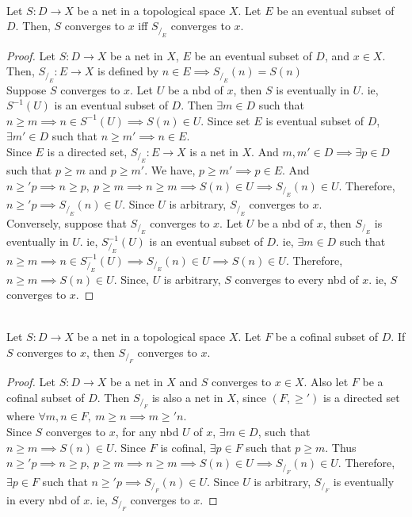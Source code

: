 \begin{proposition}\cite[10.1.6]{joshi}\\
	Let $S : D \to X$ be a net in a topological space $X$. Let $E$ be an eventual subset of $D$. Then, $S$ converges to $x$ iff $S_{/_E}$ converges to $x$.\cite[10.1.6]{joshi}
\end{proposition}
\begin{proof}
	Let $S : D \to X$ be a net in $X$, $E$ be an eventual subset of $D$, and $x \in X$. Then, $S_{/_E} : E \to X$ is defined by $n \in E \implies S_{/_E}(n) = S(n)$\\
	
	Suppose $S$ converges to $x$. Let $U$ be a nbd of $x$, then $S$ is eventually in $U$. ie, $S^{-1}(U)$ is an eventual subset of $D$. Then $\exists m \in D$ such that $n \ge m \implies n \in S^{-1}(U) \implies S(n) \in U$. Since set $E$ is eventual subset of $D$, $\exists m' \in D$ such that $n \ge m' \implies n \in E$.\\
	
	Since $E$ is a directed set, $S_{/_E} : E \to X$ is a net in $X$. And $m,m' \in D \implies \exists p \in D$ such that $p \ge m$ and $p \ge m'$. We have, $p \ge m' \implies p \in E$. And $n \ge' p \implies n \ge p,\ p \ge m \implies n \ge m \implies S(n) \in U \implies S_{/_E}(n) \in U$. Therefore, $n \ge' p \implies S_{/_E}(n) \in U$. Since $U$ is arbitrary, $S_{/_E}$ converges to $x$.\\

	Conversely, suppose that $S_{/_E}$ converges to $x$. Let $U$ be a nbd of $x$, then $S_{/_E}$ is eventually in $U$. ie, $S_{/_E}^{-1}(U)$ is an eventual subset of $D$. ie, $\exists m \in D$ such that $n \ge m \implies n \in S_{/_E}^{-1}(U) \implies S_{/_E}(n) \in U \implies S(n) \in U$. Therefore, $n \ge m \implies S(n) \in U$. Since, $U$ is arbitrary, $S$ converges to every nbd of $x$. ie, $S$ converges to $x$.
\end{proof}

\begin{proposition}\cite[10.1.8]{joshi}\\
	Let $S : D \to X$ be a net in a topological space $X$. Let $F$ be a cofinal subset of $D$. If $S$ converges to $x$, then $S_{/_F}$ converges to $x$.
\end{proposition}
\begin{proof}
	Let $S : D \to X$ be a net in $X$ and $S$ converges to $x \in X$. Also let $F$ be a cofinal subset of $D$. Then $S_{/_F}$ is also a net in $X$, since $(F,\ge')$ is a directed set where $\forall m,n \in F,\ m \ge n \implies m \ge' n$.\\

	Since $S$ converges to $x$, for any nbd $U$ of $x$, $\exists m \in D$, such that $n \ge m \implies S(n) \in U$. Since $F$ is cofinal, $\exists p \in F$ such that $p \ge m$. Thus $n \ge' p \implies n \ge p,\ p \ge m \implies n \ge m \implies S(n) \in U \implies S_{/_F}(n) \in U$. Therefore, $\exists p \in F$ such that $n \ge' p \implies S_{/_F}(n) \in U$. Since $U$ is arbitrary, $S_{/_F}$ is eventually in every nbd of $x$. ie, $S_{/_F}$ converges to $x$.
\end{proof}

